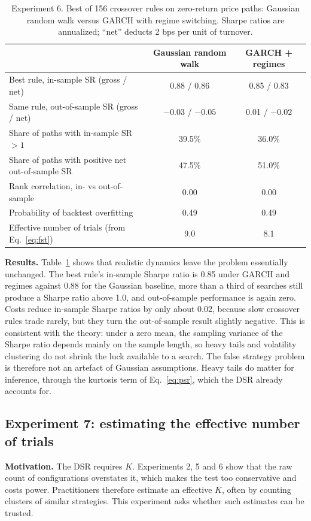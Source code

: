 \documentclass[11pt]{article}
\begin{document}
\begin{table}[h]
\centering
\caption{Experiment 6. Best of 156 crossover rules on zero-return price paths: Gaussian random walk versus GARCH with regime switching. Sharpe ratios are annualized; ``net'' deducts 2 bps per unit of turnover.}
\label{tab:exp6}
\small
\begin{tabular}{lcc}
\toprule
 & Gaussian random walk & GARCH + regimes \\
\midrule
Best rule, in-sample SR (gross / net) & 0.88 / 0.86 & 0.85 / 0.83 \\
Same rule, out-of-sample SR (gross / net) & $-0.03$ / $-0.05$ & 0.01 / $-0.02$ \\
Share of paths with in-sample SR $> 1$ & 39.5\% & 36.0\% \\
Share of paths with positive net out-of-sample SR & 47.5\% & 51.0\% \\
Rank correlation, in- vs out-of-sample & 0.00 & 0.00 \\
Probability of backtest overfitting & 0.49 & 0.49 \\
Effective number of trials (from Eq.~\ref{eq:fst}) & 9.0 & 8.1 \\
\bottomrule
\end{tabular}
\end{table}

\textbf{Results.} Table~\ref{tab:exp6} shows that realistic dynamics leave the problem essentially unchanged. The best rule's in-sample Sharpe ratio is 0.85 under GARCH and regimes against 0.88 for the Gaussian baseline, more than a third of searches still produce a Sharpe ratio above 1.0, and out-of-sample performance is again zero. Costs reduce in-sample Sharpe ratios by only about 0.02, because slow crossover rules trade rarely, but they turn the out-of-sample result slightly negative. This is consistent with the theory: under a zero mean, the sampling variance of the Sharpe ratio depends mainly on the sample length, so heavy tails and volatility clustering do not shrink the luck available to a search. The false strategy problem is therefore not an artefact of Gaussian assumptions. Heavy tails do matter for inference, through the kurtosis term of Eq.~\eqref{eq:psr}, which the DSR already accounts for.

\subsection{Experiment 7: estimating the effective number of trials}
\textbf{Motivation.} The DSR requires $K$. Experiments 2, 5 and 6 show that the raw count of configurations overstates it, which makes the test too conservative and costs power. Practitioners therefore estimate an effective $K$, often by counting clusters of similar strategies. This experiment asks whether such estimates can be trusted.
\end{document}
